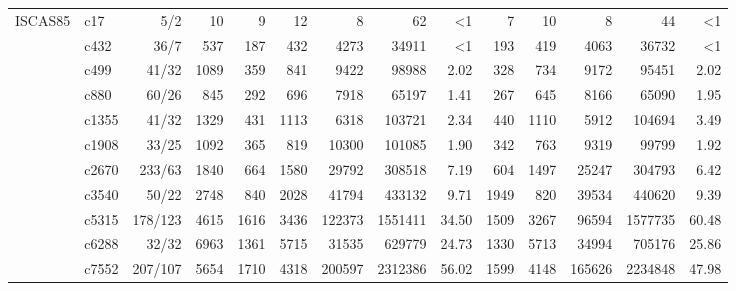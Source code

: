\begin{sidewaystable}[htbp]
{\begin{tabular}{|r|l|r|r|r|r|r|r|r|r|r|r|r|r|}
		\midrule
		\multicolumn{1}{|l|}{ISCAS85 \cite{iscas}} & c17   & 5/2   & 10    & 9     & 12    & 8     & 62    & <1    & 7     & 10    & 8     & 44    & <1 \\
		& c432  & 36/7  & 537   & 187   & 432   & 4273  & 34911 & <1    & 193   & 419   & 4063  & 36732 & <1 \\
		& c499  & 41/32 & 1089  & 359   & 841   & 9422  & 98988 & 2.02 & 328   & 734   & 9172  & 95451 & 2.02 \\
		& c880  & 60/26 & 845   & 292   & 696   & 7918  & 65197 & 1.41 & 267   & 645   & 8166  & 65090 & 1.95 \\
		& c1355 & 41/32 & 1329  & 431   & 1113  & 6318  & 103721 & 2.34 & 440   & 1110  & 5912  & 104694 & 3.49 \\
		& c1908 & 33/25 & 1092  & 365   & 819   & 10300 & 101085 & 1.90 & 342   & 763   & 9319  & 99799 & 1.92 \\
		& c2670 & 233/63 & 1840  & 664   & 1580  & 29792 & 308518 & 7.19 & 604   & 1497  & 25247 & 304793 & 6.42 \\
		& c3540 & 50/22 & 2748  & 840   & 2028  & 41794 & 433132 & 9.71 & 1949  & 820   & 39534 & 440620 & 9.39 \\
		& c5315 & 178/123 & 4615  & 1616  & 3436  & 122373 & 1551411 & 34.50 & 1509  & 3267  & 96594 & 1577735 & 60.48 \\
		& c6288 & 32/32 & 6963  & 1361  & 5715  & 31535 & 629779 & 24.73 & 1330  & 5713  & 34994 & 705176 & 25.86 \\
		& c7552 & 207/107 & 5654  & 1710  & 4318  & 200597 & 2312386 & 56.02 & 1599  & 4148  & 165626 & 2234848 & 47.98 \\
		\bottomrule
	\end{tabular}}%
	\label{tab:addlabel}%
\end{sidewaystable}%


